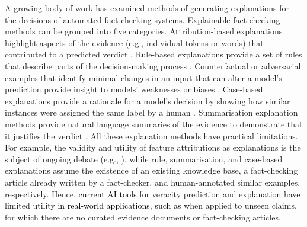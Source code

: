 A growing body of work has examined methods of generating explanations for the decisions of automated fact-checking systems.
Explainable fact-checking methods can be grouped into five categories.
Attribution-based explanations highlight aspects of the evidence (e.g., individual tokens or words) that contributed to a predicted verdict \cite{popat2018declare}.
Rule-based explanations provide a set of rules that describe parts of the decision-making process \cite{gad2019exfakt}.
Counterfactual or adversarial examples that identify minimal changes in an input that can alter a model's prediction provide insight to models' weaknesses or biases \cite{atanasova2020adversarial}.
Case-based explanations provide a rationale for a model's decision by showing how similar instances were assigned the same label by a human \cite{das2022prototex}.
Summarisation explanation methods provide natural language summaries of the evidence to demonstrate that it justifies the verdict \cite{atanasova2020generating,kotonya2020fcpublichealth}.
All these explanation methods have practical limitations.
For example, the validity and utility of feature attributions as explanations is the subject of ongoing debate (e.g., \cite{jain2019attention,bibal2022attentionexpl}), while rule, summarisation, and case-based explanations assume the existence of an existing knowledge base, a fact-checking article already written by a fact-checker, and human-annotated similar examples, respectively.
Hence, \textcolor{black}{current AI tools for} veracity prediction and explanation have limited utility \textcolor{black}{in real-world applications, such as}  when applied to unseen claims, for which there are no curated evidence documents or fact-checking articles.


